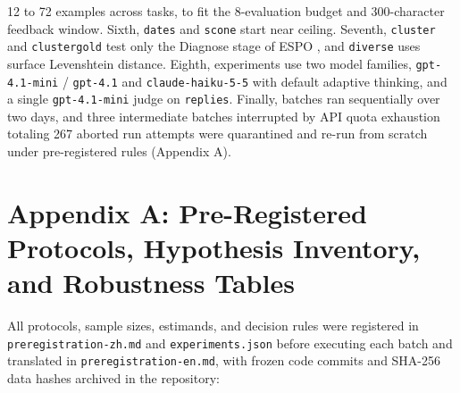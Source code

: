\documentclass[10pt]{article}
\begin{document}
12 to 72 examples across tasks, to fit the 8-evaluation budget and
300-character feedback window. Sixth, \texttt{dates} and \texttt{scone}
start near ceiling. Seventh, \texttt{cluster} and \texttt{clustergold}
test only the Diagnose stage of ESPO \citep{liu2026espo}, and
\texttt{diverse} uses surface Levenshtein distance. Eighth, experiments
use two model families, \texttt{gpt-4.1-mini} / \texttt{gpt-4.1} and
\texttt{claude-haiku-5-5} with default adaptive thinking, and a single
\texttt{gpt-4.1-mini} judge on \texttt{replies}. Finally, batches ran
sequentially over two days, and three intermediate batches interrupted
by API quota exhaustion totaling 267 aborted run attempts were
quarantined and re-run from scratch under pre-registered rules (Appendix
A).

\hypertarget{appendix-a-pre-registered-protocols-hypothesis-inventory-and-robustness-tables}{%
\section{Appendix A: Pre-Registered Protocols, Hypothesis Inventory, and
Robustness
Tables}\label{appendix-a-pre-registered-protocols-hypothesis-inventory-and-robustness-tables}}

All protocols, sample sizes, estimands, and decision rules were
registered in \texttt{preregistration-zh.md} and
\texttt{experiments.json} before executing each batch and translated in
\texttt{preregistration-en.md}, with frozen code commits and SHA-256
data hashes archived in the repository:
\end{document}
